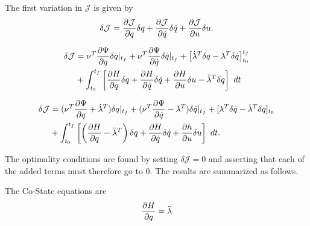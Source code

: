 The first variation in $\mathcal{  J  }$ is given by\\

\begin{equation}
    \delta  \mathcal{  J  } = \frac{\partial \mathcal{  J  }}{\partial q} \delta q + \frac{\partial \mathcal{  J  }}{\partial \dot q} \delta \dot q   +  \frac{\partial \mathcal{  J  }}{\partial u} \delta u.
\end{equation}


\begin{equation}
\begin{split}
    \delta \mathcal{  J  } &= \nu^T \frac{\partial \Psi}{\partial q}\delta q |_{t_f}
                 + \nu^T \frac{\partial \Psi}{\partial \dot q}\delta \dot q |_{t_f}
                 + \big[ \dot \lambda^T \delta q - \lambda^T  \delta \dot q\big]_{t_0}^{t_f}\\
               &+ \int_{t_0}^{t_f}  \left[ \frac{\partial H}{\partial q}\delta q +
                                           \frac{\partial H}{\partial \dot q}\delta \dot q
                                           + \frac{\partial H}{\partial u}\delta u
                                           - \ddot \lambda^T  \delta q  \right]   \text{  } dt\\
\end{split}
\end{equation}

\begin{equation}
\begin{split}
    \delta \mathcal{  J  } &= (\nu^T\frac{\partial \Psi}{\partial q} + \dot \lambda^T) \delta q |_{t_f}
                 + (\nu^T\frac{\partial \Psi}{\partial \dot q} - \lambda^T) \delta \dot q |_{t_f}
                 +  [ \lambda^T  \delta \dot q - \dot \lambda^T \delta q]_{t_0}\\
              & + \int_{t_0}^{t_f} \left[ \left( \frac{\partial H}{\partial q} - \ddot \lambda^T \right) \delta q
                                              + \frac{\partial H}{\partial \dot q} \delta \dot q +  \frac{\partial h}{\partial u} \delta u \right] \text{  } dt.\\
\end{split}
\end{equation}


The optimality conditions are found by setting $\delta \mathcal{  J  } = 0 $ and asserting that each of the added terms must therefore go to 0. The results are summarized as follows.

The Co-State equations are
\begin{equation}
    \label{costate}
    \frac{\p H}{ \p q } = \ddot \lambda
\end{equation}

